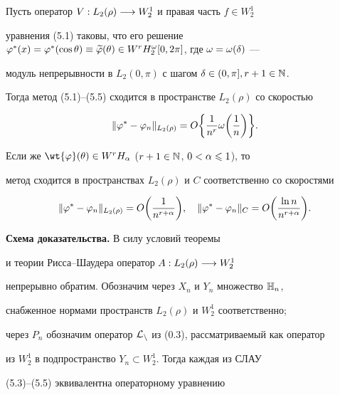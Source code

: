 \begin{cornonum}


Пусть оператор $V : L_2(\rho) \longrightarrow W_2^1$ и правая часть $f\in W_2^1$


уравнения (5.1) таковы, что его решение $\vp^*(x)=\vp^*(\cos \theta)\equiv


\widetilde{\vp}(\theta)\in W^rH_2^\omega[0,2\pi]$, где $\omega=\omega(\de)$ ---


модуль непрерывности в $L_2(0,\pi)$ с шагом $\delta\in (0,\pi],r+1\in \Bbb{N}$.


Тогда метод (5.1)--(5.5) сходится в пространстве $L_2(\rho)$ со скоростью


\begin{equation}


\|\vp^*-\vp_n\|_{L_2(\rho)}=O\bigg\{\frac{1}{n^r}\omega\bigg(\frac{1}{n}\bigg)


\bigg\}.


\end{equation}


Если же $\wt {\vp}(\theta)\in W^rH_\al$ ($r+1\in\Bbb N$, $0<\alpha\leqslant 1$), то


метод сходится в пространствах $L_2(\rho)$ и $C$ соответственно со скоростями 


\begin{equation}


\|\vp^*-\vp_n\|_{L_2(\rho)}=O\bigg(\frac{1}{n^{r+\al}}\bigg),\quad


\|\vp^*-\vp_n\|_C=O\bigg(\frac{\ln n}{n^{r+\al}}\bigg).


\end{equation}


\end{cornonum}








{\bf Схема доказательства.} В силу условий теоремы


и теории Рисса--Шаудера \cite{11} оператор $A : L_2(\rho) \longrightarrow W_2^1$


непрерывно обратим. Обозначим через $X_n$ и $Y_n$ множество $\Bbb{H}_n$,


снабженное нормами пространств $L_2(\rho)$ и $W_2^1$ соответственно;


через $P_n$ обозначим оператор $\cal{L}_n$ из (0.3), рассматриваемый как оператор


из $W_2^1$ в подпространство $Y_n\subset W_2^1$. Тогда каждая из СЛАУ


(5.3)--(5.5) эквивалентна операторному уравнению


